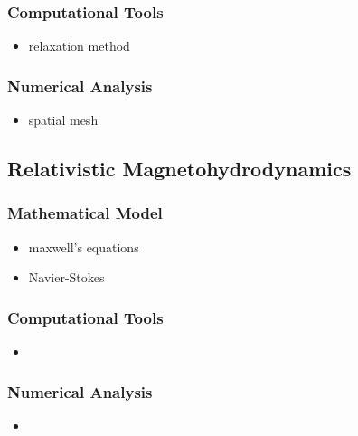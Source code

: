 \documentclass{report}
\begin{document}
        \subsubsection{Computational Tools}

            \begin{itemize}
                \item relaxation method
            \end{itemize}

        \subsubsection{Numerical Analysis}

            \begin{itemize}
                \item spatial mesh
            \end{itemize}

    \subsection{Relativistic Magnetohydrodynamics}

        \subsubsection{Mathematical Model}

            \begin{itemize}
                \item maxwell's equations
                \item Navier-Stokes
            \end{itemize}

        \subsubsection{Computational Tools}

            \begin{itemize}
                \item 
            \end{itemize}

        \subsubsection{Numerical Analysis}

            \begin{itemize}
                \item 
            \end{itemize}
\end{document}

